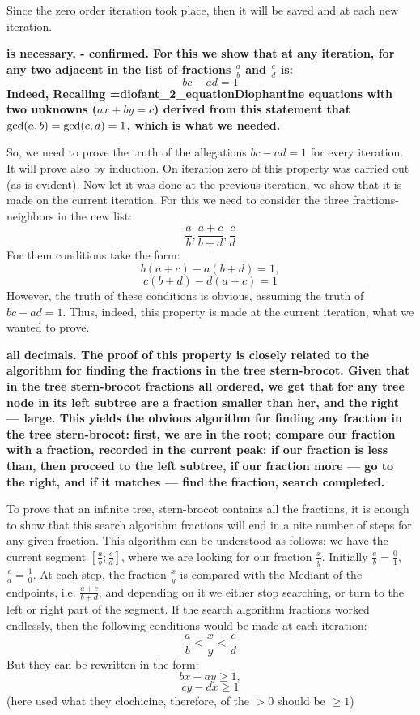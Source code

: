 Since the zero order iteration took place, then it will be saved and at each new iteration.

\bf{is necessary, - confirmed}. For this we show that at any iteration, for any two adjacent in the list of fractions $\frac{a}{b}$ and $\frac{c}{d}$ is:
$$ bc-ad=1 $$
Indeed, Recalling \algohref=diofant_2_equation{Diophantine equations with two unknowns ($ax+by=c$)} derived from this statement that ${\rm gcd}(a,b) = {\rm gcd}(c,d) = 1$, which is what we needed.

So, we need to prove the truth of the allegations $bc-ad=1$ for every iteration. It will prove also by induction. On iteration zero of this property was carried out (as is evident). Now let it was done at the previous iteration, we show that it is made on the current iteration. For this we need to consider the three fractions-neighbors in the new list:
$$ \frac{a}{b}, \frac{a+c}{b+d}, \frac{c}{d} $$
For them conditions take the form:
$$ b(a+c) - a(b+d) = 1, $$
$$ c(b+d) - d(a+c) = 1 $$
However, the truth of these conditions is obvious, assuming the truth of $bc-ad=1$. Thus, indeed, this property is made at the current iteration, what we wanted to prove.

\bf{all decimals}. The proof of this property is closely related to the algorithm for finding the fractions in the tree stern-brocot. Given that in the tree stern-brocot fractions all ordered, we get that for any tree node in its left subtree are a fraction smaller than her, and the right --- large. This yields the obvious algorithm for finding any fraction in the tree stern-brocot: first, we are in the root; compare our fraction with a fraction, recorded in the current peak: if our fraction is less than, then proceed to the left subtree, if our fraction more --- go to the right, and if it matches --- find the fraction, search completed.

To prove that an infinite tree, stern-brocot contains all the fractions, it is enough to show that this search algorithm fractions will end in a nite number of steps for any given fraction. This algorithm can be understood as follows: we have the current segment $\left[ \frac{a}{b}; \frac{c}{d} \right]$, where we are looking for our fraction $\frac{x}{y}$. Initially $\frac{a}{b}=\frac{0}{1}$, $\frac{c}{d}=\frac{1}{0}$. At each step, the fraction $\frac{x}{y}$ is compared with the Mediant of the endpoints, i.e. $\frac{a+c}{b+d}$, and depending on it we either stop searching, or turn to the left or right part of the segment. If the search algorithm fractions worked endlessly, then the following conditions would be made at each iteration:
$$ \frac{a}{b} < \frac{x}{y} < \frac{c}{d} $$
But they can be rewritten in the form:
$$ bx-ay \ge 1, $$
$$ cy-dx \ge 1 $$
(here used what they clochicine, therefore, of the $>0$ should be $\ge 1$)

